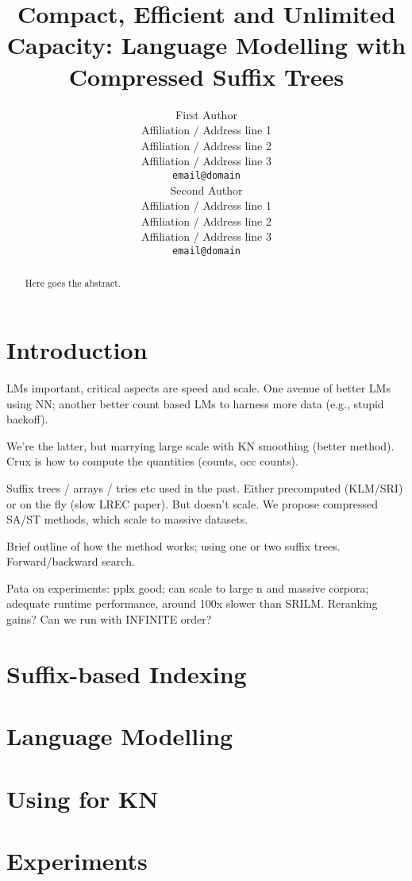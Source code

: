 \documentclass[11pt,a4paper]{article}
\title{Compact, Efficient and Unlimited Capacity:
    Language Modelling with Compressed Suffix Trees}
\author{First Author \\
  Affiliation / Address line 1 \\
  Affiliation / Address line 2 \\
  Affiliation / Address line 3 \\
  {\tt email@domain} \\\And
  Second Author \\
  Affiliation / Address line 1 \\
  Affiliation / Address line 2 \\
  Affiliation / Address line 3 \\
  {\tt email@domain} \\}
\date{}
\begin{document}
\maketitle
\begin{abstract}
  Here goes the abstract.
\end{abstract}

\section{Introduction}

LMs important, critical aspects are speed and scale. One avenue of better LMs using NN; another
better count based LMs to harness more data (e.g., stupid backoff). 

We're the latter, but marrying large scale with KN smoothing (better method). Crux is how to compute
the quantities (counts, occ counts). 

Suffix trees / arrays / tries etc used in the past. Either precomputed (KLM/SRI) or on the fly (slow
LREC paper). But doesn't scale. We propose compressed SA/ST methods, which scale to massive datasets.

Brief outline of how the method works; using one or two suffix trees. Forward/backward search.

Pata on experiments: pplx good; can scale to large n and massive corpora; adequate runtime
performance, around 100x slower than SRILM. Reranking gains? Can we run with INFINITE order?

\section{Suffix-based Indexing}


\section{Language Modelling}


\section{Using \CST for KN}


\section{Experiments}

\end{document}
